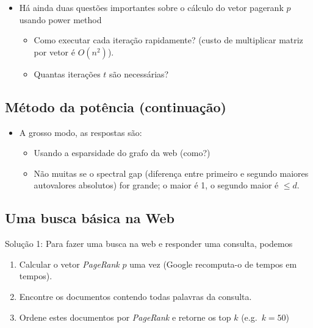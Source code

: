 \documentclass[
  letterpaper,
  DIV=11,
  numbers=noendperiod]{scrartcl}
\providecommand{\tightlist}{%
  \setlength{\itemsep}{0pt}\setlength{\parskip}{0pt}}\usepackage{longtable,booktabs,array}
\begin{document}
\begin{itemize}
\tightlist
\item
  Há ainda duas questões importantes sobre o cálculo do vetor pagerank
  \(p\) usando power method

  \begin{itemize}
  \tightlist
  \item
    Como executar cada iteração rapidamente? (custo de multiplicar
    matriz por vetor é \(O(n^2)\)).
  \item
    Quantas iterações \(t\) são necessárias?
  \end{itemize}
\end{itemize}

\hypertarget{muxe9todo-da-potuxeancia-continuauxe7uxe3o-1}{%
\subsection{Método da potência
(continuação)}\label{muxe9todo-da-potuxeancia-continuauxe7uxe3o-1}}

\begin{itemize}
\tightlist
\item
  A grosso modo, as respostas são:

  \begin{itemize}
  \tightlist
  \item
    Usando a esparsidade do grafo da web (como?)
  \item
    Não muitas se o spectral gap (diferença entre primeiro e segundo
    maiores autovalores absolutos) for grande; o maior é 1, o segundo
    maior é \(\le d\).
  \end{itemize}
\end{itemize}

\hypertarget{uma-busca-buxe1sica-na-web}{%
\subsection{Uma busca básica na Web}\label{uma-busca-buxe1sica-na-web}}

Solução 1: Para fazer uma busca na web e responder uma consulta, podemos

\begin{enumerate}
\def\labelenumi{\arabic{enumi}.}
\tightlist
\item
  Calcular o vetor \emph{PageRank} \(p\) uma vez (Google recomputa-o de
  tempos em tempos).
\item
  Encontre os documentos contendo todas palavras da consulta.
\item
  Ordene estes documentos por \emph{PageRank} e retorne os top \(k\)
  (e.g.~\(k=50\))
\end{enumerate}
\end{document}
